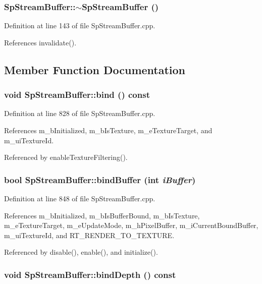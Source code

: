 \subsubsection{\setlength{\rightskip}{0pt plus 5cm}Sp\-Stream\-Buffer::$\sim${\bf Sp\-Stream\-Buffer} ()}\label{classSpark_1_1SpStreamBuffer_a1}


Definition at line 143 of file Sp\-Stream\-Buffer.cpp.

References invalidate().

\subsection{Member Function Documentation}
\subsubsection{\setlength{\rightskip}{0pt plus 5cm}void Sp\-Stream\-Buffer::bind () const}\label{classSpark_1_1SpStreamBuffer_a9}


Definition at line 828 of file Sp\-Stream\-Buffer.cpp.

References m\_\-b\-Initialized, m\_\-b\-Is\-Texture, m\_\-e\-Texture\-Target, and m\_\-ui\-Texture\-Id.

Referenced by enable\-Texture\-Filtering().
\subsubsection{\setlength{\rightskip}{0pt plus 5cm}bool Sp\-Stream\-Buffer::bind\-Buffer (int {\em i\-Buffer})}\label{classSpark_1_1SpStreamBuffer_a11}


Definition at line 848 of file Sp\-Stream\-Buffer.cpp.

References m\_\-b\-Initialized, m\_\-b\-Is\-Buffer\-Bound, m\_\-b\-Is\-Texture, m\_\-e\-Texture\-Target, m\_\-e\-Update\-Mode, m\_\-h\-Pixel\-Buffer, m\_\-i\-Current\-Bound\-Buffer, m\_\-ui\-Texture\-Id, and RT\_\-RENDER\_\-TO\_\-TEXTURE.

Referenced by disable(), enable(), and initialize().
\subsubsection{\setlength{\rightskip}{0pt plus 5cm}void Sp\-Stream\-Buffer::bind\-Depth () const}\label{classSpark_1_1SpStreamBuffer_a10}


